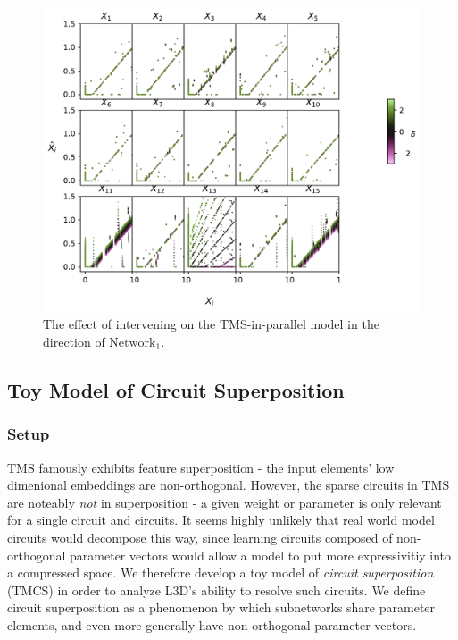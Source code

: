 \documentclass{article}
\theoremstyle{plain}
\theoremstyle{definition}
\theoremstyle{remark}
\begin{document}
\begin{figure}
    \centerline{\includegraphics[width=\columnwidth]{../figures/4_tms_intervention.pdf}}
    \centering
    \caption{The effect of intervening on the TMS-in-parallel model in the direction of $\text{Network}_1$.}\label{fig:4_tms_intervention}
\end{figure}

\subsection{Toy Model of Circuit Superposition}

\subsubsection{Setup}


TMS famously exhibits feature superposition - the input elements' low dimenional embeddings are non-orthogonal. However, the sparse circuits in TMS are noteably \textit{not} in superposition - a given weight or parameter is only relevant for a single circuit and circuits. It seems highly unlikely that real world model circuits would decompose this way, since learning circuits composed of non-orthogonal parameter vectors would allow a model to put more expressivitiy into a compressed space. We therefore develop a toy model of \textit{circuit superposition} (TMCS) in order to analyze L3D's ability to resolve such circuits. We define circuit superposition as a phenomenon by which subnetworks share parameter elements, and even more generally have non-orthogonal parameter vectors. 
\end{document}
